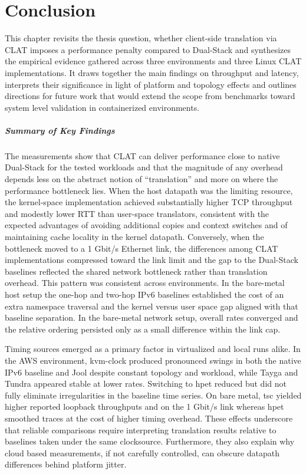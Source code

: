 \chapter{Conclusion}
This chapter revisits the thesis question, whether client-side translation via CLAT imposes a performance penalty compared to Dual-Stack and synthesizes the empirical evidence gathered across three environments and three Linux CLAT implementations. It draws together the main findings on throughput and latency, interprets their significance in light of platform and topology effects and outlines directions for future work that would extend the scope from benchmarks toward system level validation in containerized environments.

\paragraph{Summary of Key Findings}
The measurements show that CLAT can deliver performance close to native Dual-Stack for the tested workloads and that the magnitude of any overhead depends less on the abstract notion of “translation” and more on where the performance bottleneck lies. When the host datapath was the limiting resource, the kernel-space implementation achieved substantially higher TCP throughput and modestly lower RTT than user-space translators, consistent with the expected advantages of avoiding additional copies and context switches and of maintaining cache locality in the kernel datapath. Conversely, when the bottleneck moved to a 1 Gbit/s Ethernet link, the differences among CLAT implementations compressed toward the link limit and the gap to the Dual-Stack baselines reflected the shared network bottleneck rather than translation overhead. This pattern was consistent across environments. In the bare-metal host setup the one-hop and two-hop IPv6 baselines established the cost of an extra namespace traversal and the kernel versus user space gap aligned with that baseline separation. In the bare-metal network setup, overall rates converged and the relative ordering persisted only as a small difference within the link cap.

Timing sources emerged as a primary factor in virtualized and local runs alike. In the AWS environment, kvm-clock produced pronounced swings in both the native IPv6 baseline and Jool despite constant topology and workload, while Tayga and Tundra appeared stable at lower rates. Switching to hpet reduced but did not fully eliminate irregularities in the baseline time series. On bare metal, tsc yielded higher reported loopback throughputs and on the 1 Gbit/s link whereas hpet smoothed traces at the cost of higher timing overhead. These effects underscore that reliable comparisons require interpreting translation results relative to baselines taken under the same clocksource. Furthermore, they also explain why cloud based measurements, if not carefully controlled, can obscure datapath differences behind platform jitter.


